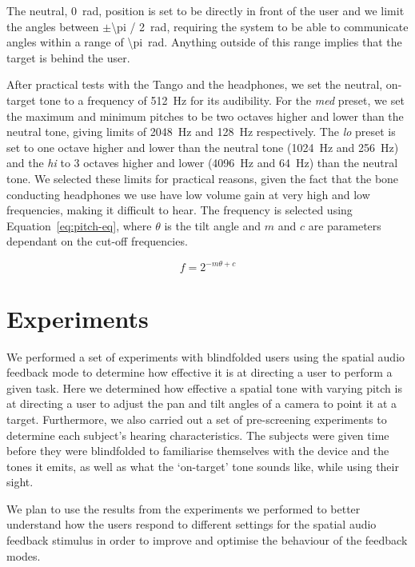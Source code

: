 \documentclass[format=sigconf, review=true, screen=true, anonymous=true]{acmart}
\begin{document}
The neutral, \SI{0}{\radian}, position is set to be directly in front of the user and we limit the angles between $\pm$\SI[quotient-mode=fraction]{\pi / 2}{\radian}, requiring the system to be able to communicate angles within a range of \SI{\pi}{\radian}. Anything outside of this range implies that the target is behind the user.

After practical tests with the Tango and the headphones, we set the neutral, on-target tone to a frequency of \SI{512}{\hertz} for its audibility. For the \emph{med} preset, we set the maximum and minimum pitches to be two octaves higher and lower than the neutral tone, giving limits of \SI{2048}{\hertz} and \SI{128}{\hertz} respectively. The \emph{lo} preset is set to one octave higher and lower than the neutral tone (\SI{1024}{\hertz} and \SI{256}{\hertz}) and the \emph{hi} to 3 octaves higher and lower (\SI{4096}{\hertz} and \SI{64}{\hertz}) than the neutral tone. We selected these limits for practical reasons, given the fact that the bone conducting headphones we use have low volume gain at very high and low frequencies, making it difficult to hear. The frequency is selected using Equation~\ref{eq:pitch-eq}, where $\theta$ is the tilt angle and $m$ and $c$ are parameters dependant on the cut-off frequencies.

\begin{equation}
  \label{eq:pitch-eq}
  f = 2^{-m \theta + c}
\end{equation}

\section{Experiments}
\label{sec:experiments}

We performed a set of experiments with blindfolded users using the spatial audio feedback mode to determine how effective it is at directing a user to perform a given task. Here we determined how effective a spatial tone with varying pitch is at directing a user to adjust the pan and tilt angles of a camera to point it at a target. Furthermore, we also carried out a set of pre-screening experiments to determine each subject's hearing characteristics. The subjects were given time before they were blindfolded to familiarise themselves with the device and the tones it emits, as well as what the `on-target' tone sounds like, while using their sight. 

We plan to use the results from the experiments we performed to better understand how the users respond to different settings for the spatial audio feedback stimulus in order to improve and optimise the behaviour of the feedback modes.
\end{document}
